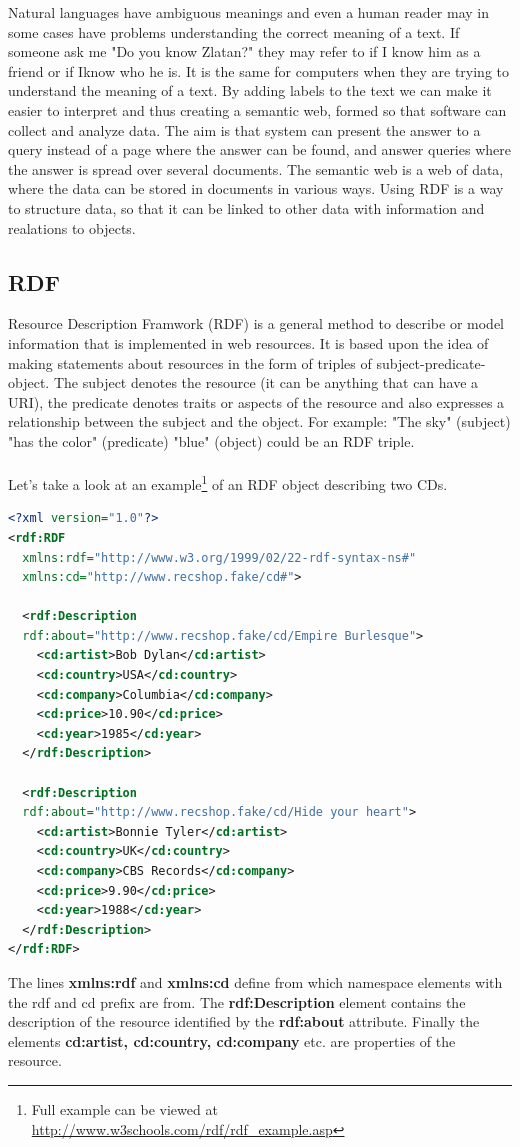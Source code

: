 \documentclass[a4paper,11pt]{kth-mag}
\begin{document}
Natural languages have ambiguous meanings and even
a human reader may in some cases have problems understanding the correct
meaning of a text. If someone ask me  "Do you know Zlatan?" they may refer to if I know him as a friend or if Iknow who he is. It is the same for computers when they are trying to understand the meaning of a text. By adding labels to the text we can make it easier to interpret and thus creating a semantic web, formed so that software can collect and analyze data. The aim is that system can present the answer to a query instead of a page where the answer can be found, and answer queries where the answer is spread over several documents.
The semantic web is a web of data, where the data can be stored in documents in various ways. Using RDF is a way to structure data, so that it can be linked to other data with information and realations to objects.

\subsection{RDF}
Resource Description Framwork (RDF) is a general method to describe or model information that is implemented in web resources. It is based upon the idea of making statements about resources in the form of triples of subject-predicate-object. The subject denotes the resource (it can be anything that can have a URI), the predicate denotes traits or aspects of the resource and also expresses a relationship between the subject and the object. For example: "The sky" (subject) "has the color" (predicate) "blue" (object) could be an RDF triple.\\\\
Let's take a look at an example\footnote{Full example can be viewed at \url{http://www.w3schools.com/rdf/rdf_example.asp}} of an RDF object describing two CDs.
\begin{lstlisting}[language=xml, caption=An RDF example describing two records, label=rdfexample]
<?xml version="1.0"?>
<rdf:RDF 
  xmlns:rdf="http://www.w3.org/1999/02/22-rdf-syntax-ns#"
  xmlns:cd="http://www.recshop.fake/cd#">

  <rdf:Description
  rdf:about="http://www.recshop.fake/cd/Empire Burlesque">
    <cd:artist>Bob Dylan</cd:artist>
    <cd:country>USA</cd:country>
    <cd:company>Columbia</cd:company>
    <cd:price>10.90</cd:price>
    <cd:year>1985</cd:year>
  </rdf:Description>

  <rdf:Description
  rdf:about="http://www.recshop.fake/cd/Hide your heart">
    <cd:artist>Bonnie Tyler</cd:artist>
    <cd:country>UK</cd:country>
    <cd:company>CBS Records</cd:company>
    <cd:price>9.90</cd:price>
    <cd:year>1988</cd:year>
  </rdf:Description>
</rdf:RDF>
\end{lstlisting}
The lines \textbf{xmlns:rdf} and \textbf{xmlns:cd} define from which namespace elements with the rdf and cd prefix are from. The \textbf{rdf:Description} element contains the description of the resource identified by the \textbf{rdf:about} attribute. Finally the elements \textbf{cd:artist, cd:country, cd:company} etc. are properties of the resource.
  
\end{document}
